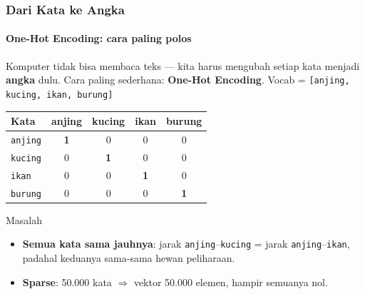 \documentclass[t,aspectratio=169,xcolor=dvipsnames]{beamer}
\begin{document}
\begin{frame}[shrink=5]
    \frametitle{Dari Kata ke Angka}
    \framesubtitle{One-Hot Encoding: cara paling polos}
    \small
    Komputer tidak bisa membaca teks --- kita harus mengubah setiap kata menjadi \textbf{angka} dulu.
    Cara paling sederhana: \textbf{One-Hot Encoding}. Vocab = \texttt{[anjing, kucing, ikan, burung]}
    \vspace{0.15em}
    \begin{center}
    \footnotesize
    \begin{tabular}{lcccc}
        \toprule
        Kata & anjing & kucing & ikan & burung \\
        \midrule
        \texttt{anjing} & \textbf{1} & 0 & 0 & 0 \\
        \texttt{kucing} & 0 & \textbf{1} & 0 & 0 \\
        \texttt{ikan}   & 0 & 0 & \textbf{1} & 0 \\
        \texttt{burung} & 0 & 0 & 0 & \textbf{1} \\
        \bottomrule
    \end{tabular}
    \end{center}
    \vspace{0.1em}
    \begin{alertblock}{Masalah}
        \footnotesize
        \begin{itemize}
            \item \textbf{Semua kata sama jauhnya}: jarak \texttt{anjing}--\texttt{kucing} = jarak \texttt{anjing}--\texttt{ikan}, padahal keduanya sama-sama hewan peliharaan.
            \item \textbf{Sparse}: 50.000 kata $\Rightarrow$ vektor 50.000 elemen, hampir semuanya nol.
        \end{itemize}
    \end{alertblock}
\end{frame}
\end{document}

